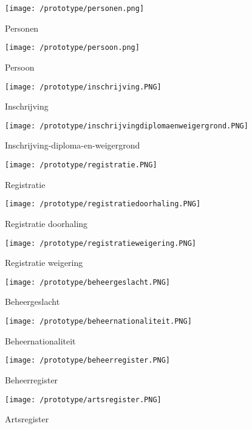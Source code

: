 \begin{figure}[ht]
    \centering
    \texttt{[image: /prototype/personen.png]}
    \caption{Personen}
    \label{fig:proto-personen}
\end{figure}

\begin{figure}[hb]
    \centering
    \texttt{[image: /prototype/persoon.png]}
    \caption{Persoon}
    \label{fig:proto-persoon}
\end{figure}

\newpage

\begin{figure}[ht]
    \centering
    \texttt{[image: /prototype/inschrijving.PNG]}
    \caption{Inschrijving}
    \label{fig:proto-inschrijving}
\end{figure}

\begin{figure}[!hb]
    \centering
    \texttt{[image: /prototype/inschrijvingdiplomaenweigergrond.PNG]}
    \caption{Inschrijving-diploma-en-weigergrond}
    \label{fig:proto-inschrijving-diploma-en-weigergrond}
\end{figure}

\newpage

\begin{figure}[ht]
    \centering
    \texttt{[image: /prototype/registratie.PNG]}
    \caption{Registratie}
    \label{fig:proto-registratie}
\end{figure}

\begin{figure}[!hb]
    \centering
    \texttt{[image: /prototype/registratiedoorhaling.PNG]}
    \caption{Registratie doorhaling}
    \label{fig:proto-registratie-doorhaling}
\end{figure}
\newpage
\begin{figure}[ht]
    \centering
    \texttt{[image: /prototype/registratieweigering.PNG]}
    \caption{Registratie weigering}
    \label{fig:proto-registratie-weigering}
\end{figure}

\begin{figure}[!hb]
    \centering
    \texttt{[image: /prototype/beheergeslacht.PNG]}
    \caption{Beheergeslacht}
    \label{fig:proto-beheergeslacht}
\end{figure}
\newpage
\begin{figure}[ht]
    \centering
    \texttt{[image: /prototype/beheernationaliteit.PNG]}
    \caption{Beheernationaliteit}
    \label{fig:proto-beheernationaliteit}
\end{figure}

\begin{figure}[!hb]
    \centering
    \texttt{[image: /prototype/beheerregister.PNG]}
    \caption{Beheerregister}
    \label{fig:proto-beheerregister}
\end{figure}
\newpage
\begin{figure}[ht]
    \centering
    \texttt{[image: /prototype/artsregister.PNG]}
    \caption{Artsregister}
    \label{fig:proto-artsregister}
\end{figure}